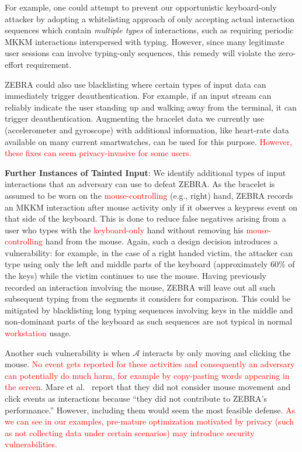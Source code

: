 \documentclass[conference]{IEEEtran}
\newcommand{\zebra}{ZEBRA\xspace}
\newcommand{\KBactivity}{keyboard-only\xspace}
\newcommand{\attacker}{$\mathcal{A}$\xspace}
\newcommand\changeOtto[1]{\textcolor{red}{#1}}
\newcommand\changeMika[1]{\textcolor{red}{#1}}
\newcommand\changeAsokan[1]{\textcolor{red}{#1}}
\newcommand\changeOtto[1]{{#1}}
\newcommand\changeMika[1]{{#1}}
\newcommand\changeAsokan[1]{{#1}}
\begin{document}
For example, one could attempt to prevent our opportunistic \KBactivity attacker by adopting a whitelisting approach of only accepting actual interaction sequences which contain {\em multiple types} of interactions, such as requiring periodic MKKM interactions interspersed with typing. However, since many legitimate user sessions can involve typing-only sequences, this remedy will violate the zero-effort requirement.

\zebra could also use blacklisting where certain types of input data can immediately trigger deauthentication. For example, if an input stream can reliably indicate the user standing up and walking away from the terminal, it can trigger deauthentication. Augmenting the bracelet data we currently use (accelerometer and gyroscope) with additional information, like heart-rate data available on many current smartwatches, can be used for this purpose. \changeMika{However, these fixes can seem privacy-invasive for some users.}

\vspace{1mm}
\noindent\textbf{Further Instances of Tainted Input}: We identify additional types of input interactions that an adversary can use to defeat \zebra. As the bracelet is assumed to be worn on the \changeMika{mouse-controlling} (e.g., right) hand, \zebra records an MKKM interaction after mouse activity only if it observes a keypress event on that side of the keyboard. This is done to reduce false negatives arising from a user who types with the \changeMika{keyboard-only} hand without removing his \changeMika{mouse-controlling} hand from the mouse. Again, such a design decision introduces a vulnerability: for example, in the case of a right handed victim, the attacker can type using only the left and middle parts of the keyboard (approximately 60\% of the keys) while the victim continues to use the mouse. Having previously recorded an interaction involving the mouse, \zebra will leave out all such subsequent typing from the segments it considers for comparison. This could be mitigated by blacklisting long typing sequences involving keys in the middle and non-dominant parts of the keyboard as such sequences are not typical in normal \changeMika{workstation} usage.

Another such vulnerability is when \attacker interacts by only moving and clicking the mouse. \changeMika{No event gets reported} \changeOtto{for these activities} \changeMika{and consequently an adversary can potentially do much harm, for example by copy-pasting words appearing in the screen.} Mare et al.~\cite{mare2014zebra} report that they did not consider mouse movement and click events as interactions because ``they did not contribute to \zebra's performance.'' However, including them would seem the most feasible defense. \changeMika{As we can see in our examples,} \changeAsokan{pre-mature optimization motivated by privacy (such as not collecting data under certain scenarios) may introduce security vulnerabilities.}
\end{document}
